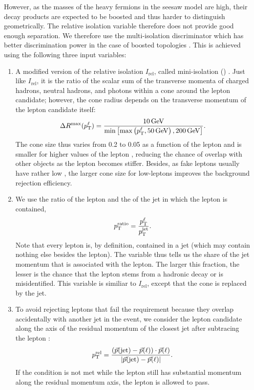 However, as the masses of the heavy fermions in the seesaw model are high, their decay products are expected to be boosted and thus harder to distinguish geometrically. The relative isolation variable therefore does not provide good enough separation. We therefore use the multi-isolation discriminator which has better discrimination power in the case of boosted topologies \cite{CMS-PAS-SUS-15-008}. This is achieved using the following three input variables:

\begin{enumerate}
	\item A modified version of the relative isolation $I_\textrm{rel}$, called mini-isolation (\miniIso) \cite{Rehermann:2010vq}. Just like $I_\textrm{rel}$, it is the ratio of the scalar sum of the transverse momenta of charged hadrons, neutral hadrons, and photons within a cone around the lepton candidate; however, the cone radius depends on the transverse momentum of the lepton candidate itself:
		\begin{equation}
			\Delta R^\textrm{max}(p_{\mathrm{T}}^\ell) = \dfrac{10\,\text{Ge\hspace{-.08em}V}}{\min\left[\max\left(p_{\mathrm{T}}^\ell, 50\,\text{Ge\hspace{-.08em}V}\right), 200\,\text{Ge\hspace{-.08em}V}\right]}.
		\end{equation}
		The cone size thus varies from 0.2 to 0.05 as a function of the lepton \pt and is smaller for higher values of the lepton \pt, reducing the chance of overlap with other objects as the lepton becomes stiffer. Besides, as fake leptons usually have rather low \pt, the larger cone size for low-\pt leptons improves the background rejection efficiency.
		
	\item We use the ratio of the lepton \pt and the \pt of the jet in which the lepton is contained,
		\begin{equation}
			p_{\mathrm{T}}^\text{ratio} = \dfrac{p_{\mathrm{T}}^\ell}{p_{\mathrm{T}}^\text{jet}}.
		\end{equation}
		Note that every lepton is, by definition, contained in a jet (which may contain nothing else besides the lepton). The \ptRatio variable thus tells us the share of the jet momentum that is associated with the lepton. The larger this fraction, the lesser is the chance that the lepton stems from a hadronic decay or is misidentified. This variable is similiar to $I_\textrm{rel}$, except that the cone is replaced by the jet.
		
	\item To avoid rejecting leptons that fail the \ptRatio requirement because they overlap accidentally with another jet in the event, we consider the lepton candidate \pt along the axis of the residual momentum of the closest jet after subtracing the lepton \pt:
		\begin{equation}
			p_{\mathrm{T}}^\text{rel}=\frac{(\vec{p}(\text{jet})-\vec{p}(\ell))\cdot \vec{p}(\ell) }{|\vec{p}(\text{jet})-\vec{p}(\ell)|}.
		\end{equation}
		If the \ptRatio condition is not met while the lepton still has substantial momentum along the residual momentum axis, the lepton is allowed to pass.
\end{enumerate}
